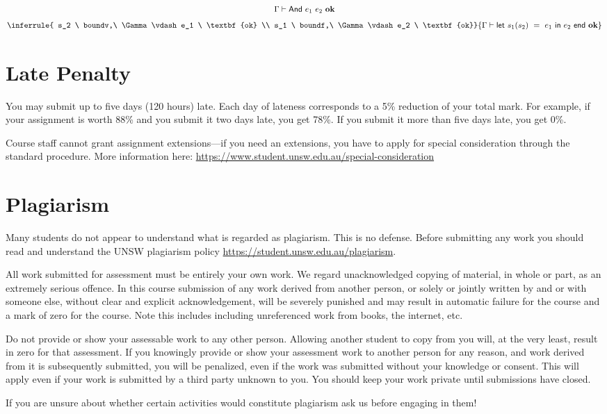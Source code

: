 \documentclass[a4paper,answers]{exam}
\begin{document}
\begin{itemize}
\begin{itemize}
\begin{solution}
\begin{gather*}
{            }
            {\Gamma \vdash \mathsf{And} \  e_1 \  e_2 \  \textbf{ok}} \\[0.5em]
             \inferrule{
            s_2 \ boundv,\ \Gamma\vdash e_1 \ \textbf{ok} \\
            s_1 \ boundf,\ \Gamma \vdash e_2 \  \textbf{ok}}{\Gamma \vdash \mathsf{let} \  s_1(s_2) \  = \  e_1 \  \mathsf{in} \  e_2 \  \mathsf{end} \  \textbf{ok}} \\
        \end{gather*}
        \end{solution}
    \end{itemize}
\end{itemize}

\section*{Late Penalty}

You may submit up to five days (120 hours) late. Each day of lateness corresponds
to a 5\% reduction of your total mark. For example, if your assignment is worth
88\% and you submit it two days late, you get 78\%. If you submit it more than
five days late, you get 0\%.

Course staff cannot grant assignment extensions---if you need an extensions,
you have to apply for special consideration through the standard procedure.
More information here: \url{https://www.student.unsw.edu.au/special-consideration}

\section*{Plagiarism}
Many students do not appear to understand what is regarded as plagiarism. This is
no defense. Before submitting any work you should read and understand the UNSW plagiarism policy
\url{https://student.unsw.edu.au/plagiarism}.

All work submitted for assessment must be entirely your own work. We regard
unacknowledged copying of material, in whole or part, as an extremely serious offence.
In this course submission of any work derived from another person, or solely or
jointly written by and or with someone else, without clear and explicit acknowledgement,
will be severely punished and may result in automatic failure for the course and
a mark of zero for the course. Note this includes including unreferenced work from
books, the internet, etc.

Do not provide or show your assessable work to any other person. Allowing another
student to copy from you will, at the very least, result in zero for that assessment. If
you knowingly provide or show your assessment work to another person for any reason,
and work derived from it is subsequently submitted, you will be penalized, even if the
work was submitted without your knowledge or consent. This will apply even if your
work is submitted by a third party unknown to you. You should keep your work private
until submissions have closed.

If you are unsure about whether certain activities would constitute plagiarism ask
us before engaging in them!
\end{document}
